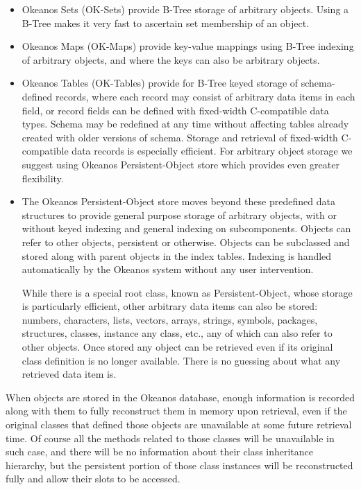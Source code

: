 \documentclass[article,oneside]{memoir}
\begin{document}
\begin{itemize}
\item Okeanos Sets (OK-Sets) provide B-Tree storage of arbitrary objects. Using a B-Tree makes it very fast to ascertain set membership of an object.

\item Okeanos Maps (OK-Maps) provide key-value mappings using B-Tree indexing of arbitrary objects, and where the keys can also be arbitrary objects. 

\item Okeanos Tables (OK-Tables) provide for B-Tree keyed storage of schema-defined records, where each record may consist of arbitrary data items in each field, or record fields can be defined with fixed-width C-compatible data types. Schema may be redefined at any time without affecting tables already created with older versions of schema. Storage and retrieval of fixed-width C-compatible data records is especially efficient. For arbitrary object storage we suggest using Okeanos {\ttfamily Persistent-Object} store which provides even greater flexibility. 

\item The Okeanos {\ttfamily Persistent-Object} store moves beyond these predefined data structures to provide general purpose storage of arbitrary objects, with or without keyed indexing and general indexing on subcomponents. Objects can refer to other objects, persistent or otherwise. Objects can be subclassed and stored along with parent objects in the index tables. Indexing is handled automatically by the Okeanos system without any user intervention.

While there is a special root class, known as {\ttfamily Persistent-Object}, whose storage is particularly efficient, other arbitrary data items can also be stored: numbers, characters, lists, vectors, arrays, strings, symbols, packages, structures, classes, instance any class, etc., any of which can also refer to other objects. Once stored any object can be retrieved even if its original class definition is no longer available. There is no guessing about what any retrieved data item is.
\end{itemize}

When objects are stored in the Okeanos database, enough information is recorded along with them to fully reconstruct them in memory upon retrieval, even if the original classes that defined those objects are unavailable at some future retrieval time. Of course all the methods related to those classes will be unavailable in such case, and there will be no information about their class inheritance hierarchy, but the persistent portion of those class instances will be reconstructed fully and allow their slots to be accessed.
\end{document}

